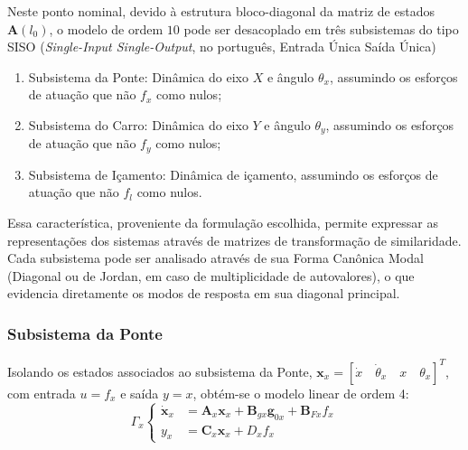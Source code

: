 \documentclass{ppgeesa}
\begin{document}
Neste ponto nominal, devido à estrutura bloco-diagonal da matriz de estados $\mathbf{A}(l_0)$, o modelo de ordem $10$ pode ser desacoplado em três subsistemas do tipo SISO (\textit{Single-Input Single-Output}, no português, Entrada Única Saída Única) 
\begin{enumerate}
    \item Subsistema da Ponte: Dinâmica do eixo $X$ e ângulo $\theta_x$, assumindo os esforços de atuação que não $f_x$ como nulos;
    \item Subsistema do Carro: Dinâmica do eixo $Y$ e ângulo $\theta_y$, assumindo os esforços de atuação que não $f_y$ como nulos;
    \item Subsistema de Içamento: Dinâmica de içamento, assumindo os esforços de atuação que não $f_l$ como nulos.
\end{enumerate}

Essa característica, proveniente da formulação escolhida, permite expressar as representações dos sistemas através de matrizes de transformação de similaridade. Cada subsistema pode ser analisado através de sua Forma Canônica Modal (Diagonal ou de Jordan, em caso de multiplicidade de autovalores), o que evidencia diretamente os modos de resposta em sua diagonal principal.

\subsubsection{Subsistema da Ponte}

Isolando os estados associados ao subsistema da Ponte, $\mathbf{x}_x = [\dot{x}\quad\dot{\theta}_x\quad x\quad\theta_x]^T$, com entrada $u = f_x$ e saída $y = x$, obtém-se o modelo linear de ordem 4:
\begin{equation}
    \Gamma_x
    \begin{cases}
      \dot{\mathbf{x}}_x &= \mathbf{A}_x \mathbf{x}_x + \mathbf{B}_{gx}\mathbf{g}_{0x} + \mathbf{B}_{Fx} f_x\\
      y_x &= \mathbf{C}_x \mathbf{x}_x + D_x f_x
  \end{cases}
\end{equation}
\end{document}
